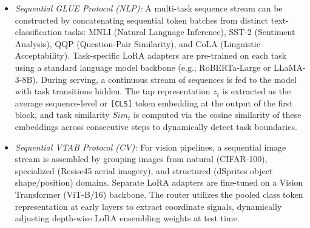 \begin{itemize}
    \begin{itemize}
        \item \emph{Sequential GLUE Protocol (NLP):} A multi-task sequence stream can be constructed by concatenating sequential token batches from distinct text-classification tasks: MNLI (Natural Language Inference), SST-2 (Sentiment Analysis), QQP (Question-Pair Similarity), and CoLA (Linguistic Acceptability). Task-specific LoRA adapters are pre-trained on each task using a standard language model backbone (e.g., RoBERTa-Large or LLaMA-3-8B). During serving, a continuous stream of sequences is fed to the model with task transitions hidden. The tap representation $z_t$ is extracted as the average sequence-level or \texttt{[CLS]} token embedding at the output of the first block, and task similarity $Sim_t$ is computed via the cosine similarity of these embeddings across consecutive steps to dynamically detect task boundaries.
        \item \emph{Sequential VTAB Protocol (CV):} For vision pipelines, a sequential image stream is assembled by grouping images from natural (CIFAR-100), specialized (Resisc45 aerial imagery), and structured (dSprites object shape/position) domains. Separate LoRA adapters are fine-tuned on a Vision Transformer (ViT-B/16) backbone. The router utilizes the pooled class token representation at early layers to extract coordinate signals, dynamically adjusting depth-wise LoRA ensembling weights at test time.
    \end{itemize}
    

\end{itemize}

